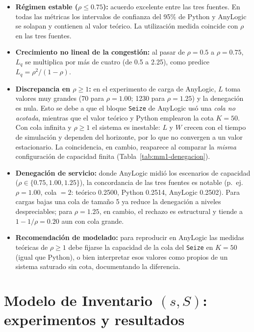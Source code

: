\documentclass[11pt,a4paper]{article}
\begin{document}
\begin{itemize}
    \item \textbf{Régimen estable ($\rho \leq 0.75$):} acuerdo excelente
          entre las tres fuentes. En todas las métricas los intervalos de
          confianza del 95\% de Python y AnyLogic se solapan y contienen al
          valor teórico. La utilización medida coincide con $\rho$ en las
          tres fuentes.
    \item \textbf{Crecimiento no lineal de la congestión:} al pasar de
          $\rho=0.5$ a $\rho=0.75$, $L_q$ se multiplica por más de cuatro
          (de 0.5 a 2.25), como predice $L_q = \rho^2/(1-\rho)$.
    \item \textbf{Discrepancia en $\rho \geq 1$:} en el experimento de carga
          de AnyLogic, $L$ toma
          valores muy grandes (70 para $\rho=1.00$; 1230 para
          $\rho=1.25$) y la denegación es nula. Esto se debe a que el
          bloque \texttt{Seize} de AnyLogic usó una \emph{cola no acotada},
          mientras que el valor teórico y Python emplearon la cota $K=50$.
          Con cola infinita y $\rho \geq 1$ el sistema es inestable: $L$ y
          $W$ crecen con el tiempo de simulación y dependen del horizonte,
          por lo que no convergen a un valor estacionario. La coincidencia,
          en cambio, reaparece al comparar la \emph{misma} configuración de
          capacidad finita (Tabla~\ref{tab:mm1-denegacion}).
    \item \textbf{Denegación de servicio:} donde AnyLogic midió los
          escenarios de capacidad ($\rho \in \{0.75,1.00,1.25\}$), la
          concordancia de las tres fuentes es notable (p.\ ej.\ $\rho=1.00$,
          cola $=2$: teórico 0.2500, Python 0.2514, AnyLogic 0.2502). Para
          cargas bajas una cola de tamaño 5 ya reduce la denegación a
          niveles despreciables; para $\rho=1.25$, en cambio, el rechazo es
          estructural y tiende a $1-1/\rho = 0.20$ aun con cola grande.
    \item \textbf{Recomendación de modelado:} para reproducir en AnyLogic
          las medidas teóricas de $\rho \geq 1$ debe fijarse la capacidad de
          la cola del \texttt{Seize} en $K=50$ (igual que Python), o bien
          interpretar esos valores como propios de un sistema saturado sin
          cota, documentando la diferencia.
\end{itemize}

\section{Modelo de Inventario $(s,S)$: experimentos y resultados}
\end{document}
